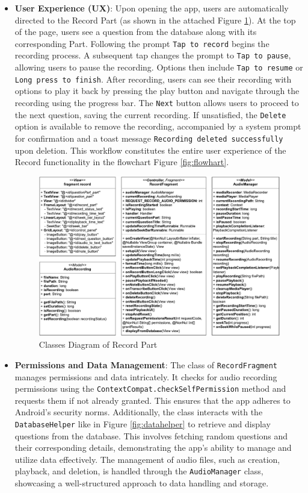 \documentclass[conference,10pt,letterpaper]{IEEEtran}
\begin{document}
\begin{itemize}
		\item \textbf{User Experience (UX)}: 
		Upon opening the app, users are automatically directed to the Record Part (as shown in the attached Figure \ref{fig:record_part}). At the top of the page, users see a question from the database along with its corresponding Part. Following the prompt \texttt{Tap to record} begins the recording process. A subsequent tap changes the prompt to \texttt{Tap to pause}, allowing users to pause the recording. Options then include \texttt{Tap to resume} or \texttt{Long press to finish}. After recording, users can see their recording with options to play it back by pressing the play button and navigate through the recording using the progress bar. The \texttt{Next} button allows users to proceed to the next question, saving the current recording. If unsatisfied, the \texttt{Delete} option is available to remove the recording, accompanied by a system prompt for confirmation and a toast message \texttt{Recording deleted successfully} upon deletion. This workflow constitutes the entire user experience of the Record functionality in the flowchart Figure \ref{fig:flowhart}.
		
		\begin{figure}
			\centering
			\includegraphics[width=6.2in]{src/record part.pdf}
			\caption{Classes Diagram of Record Part}
			\label{fig:record_part}
		\end{figure}
		
		\item \textbf{Permissions and Data Management}: 
		The class of \texttt{RecordFragment} manages permissions and data intricately. It checks for audio recording permissions using the \texttt{ContextCompat.checkSelfPermission} method and requests them if not already granted. This ensures that the app adheres to Android's security norms. Additionally, the class interacts with the \texttt{DatabaseHelper} like in Figure \ref{fig:datahelper} to retrieve and display questions from the database. This involves fetching random questions and their corresponding details, demonstrating the app's ability to manage and utilize data effectively. The management of audio files, such as creation, playback, and deletion, is handled through the \texttt{AudioManager} class, showcasing a well-structured approach to data handling and storage.
		

\end{itemize}
\end{document}
